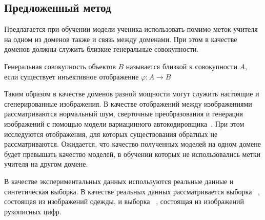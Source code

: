 \subsection{Предложенный метод}

Предлагается при обучении модели ученика использовать помимо меток учителя на одном из доменов также и связь между доменами. При этом в качестве доменов должны служить близкие генеральные совокупности.

\begin{definition}
Генеральная совокупность объектов $B$ называется близкой к совокупности $A$, если существует инъективное отображение $\varphi: A \rightarrow B$
\end{definition}

Таким образом в качестве доменов разной мощности могут служить настоящие и сгенерированные изображения. В качестве отображений между изображениями рассматриваются нормальный шум, сверточные преобразования и генерация изображений с помощью модели вариацинного автокодировщика~\cite{VAE}. При этом исследуются отображения, для которых существования обратных не рассматриваются. Ожидается, что качество полученных моделей на одном домене будет превышать качество моделей, в обучении которых не использовались метки учителя на другом домене.

В качестве экспериментальных данных используются реальные данные и синтетическая выборка. В качестве реальных данных рассматривается выборка ~\cite{FMNIST}, состоящая из изображений одежды, и выборка ~\cite{MNIST}, состоящая из изображений рукописных цифр.

